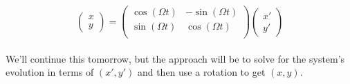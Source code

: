 \documentclass[11pt]{article}
\begin{document}
\[
\begin{pmatrix}
  x \\ y 
\end{pmatrix} = \begin{pmatrix}
  \cos(\Omega t) & -\sin(\Omega t) \\
  \sin(\Omega t) & \cos(\Omega t) \\
\end{pmatrix} \begin{pmatrix}
  x' \\ y'
\end{pmatrix}
\]
\\
We'll continue this tomorrow, but the approach will be to solve for the system's evolution in terms of $(x', y')$ and then use a rotation to get $(x,y)$.
\end{document}
